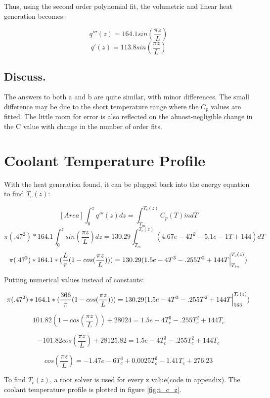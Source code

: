 \documentclass[12pt,letterpaper]{article}
\begin{document}
Thus, using the second order polynomial fit, the volumetric
and linear heat generation becomes:

\[q'''(z) = 164.1 sin(\frac{\pi z}{L})\]
\[q'(z) = 113.8 sin(\frac{\pi z}{L})\]


\subsection*{Discuss.}
The answers to both a and b are quite similar, with minor differences.
The small difference may be due to the short temperature range where
the $C_p$ values are fitted. The little room for error is also reflected
on the almost-negligible change in the C value with change in the number of 
order fits. 




\section*{Coolant Temperature Profile}
With the heat generation found, it can be plugged back
into the energy equation to find $T_c(z)$:

\[[Area] \int^{z}_0 q'''(z) dz = \int^{T_c (z)}_{T_{in}} C_p(T) \dot{m} dT\]
\[\pi (.47^2) * 164.1 \int^{z}_0 sin(\frac{\pi z}{L})  dz =
    130.29 \int^{T_c (z)}_{T_{in}} (4.67e-4T^2 -5.1e-1T + 144)  dT\]
\[\pi (.47^2) * 164.1 * (\frac{L}{\pi} (1-cos(\frac{\pi z}{L}))) =
    130.29 (1.5e-4T^3 - .255T^2 + 144 T \Big{|}^{T_c (z)}_{T_{in}})\]

Putting numerical values instead of constants:

\[\pi (.47^2) * 164.1 * (\frac{366}{\pi} (1-cos(\frac{\pi z}{L}))) =
    130.29 (1.5e-4T^3 - .255T^2 + 144 T \Big{|}^{T_c (z)}_{563})\]

\[101.82 (1- cos(\frac{\pi z}{L})) + 28024 = 1.5e-4T_c^3 - .255T_c^2 + 144 T_c \]

\[-101.82 cos(\frac{\pi z}{L}) + 28125.82 = 1.5e-4T_c^3 - .255T_c^2 + 144 T_c \]

\[ cos(\frac{\pi z}{L}) = -1.47e-6T_c^3 + 0.0025T_c^2 -1.41 T_c + 276.23\]

To find $T_c(z)$, a root solver is used for every z value(code in appendix).
The coolant temperature profile is plotted in figure \ref{fig:t_c_z}.
\end{document}
